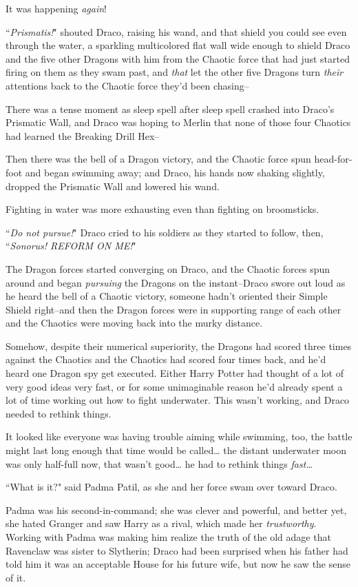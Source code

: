 It was happening \emph{again}!

``\emph{Prismatis!}" shouted Draco, raising his wand, and that shield you could see even through the water, a sparkling multicolored flat wall wide enough to shield Draco and the five other Dragons with him from the Chaotic force that had just started firing on them as they swam past, and \emph{that} let the other five Dragons turn \emph{their} attentions back to the Chaotic force they'd been chasing\---

There was a tense moment as sleep spell after sleep spell crashed into Draco's Prismatic Wall, and Draco was hoping to Merlin that none of those four Chaotics had learned the Breaking Drill Hex\---

Then there was the bell of a Dragon victory, and the Chaotic force spun head-for-foot and began swimming away; and Draco, his hands now shaking slightly, dropped the Prismatic Wall and lowered his wand.

Fighting in water was more exhausting even than fighting on broomsticks.

``\emph{Do not pursue!}" Draco cried to his soldiers as they started to follow, then, ``\emph{Sonorus! REFORM ON ME!}"

The Dragon forces started converging on Draco, and the Chaotic forces spun around and began \emph{pursuing} the Dragons on the instant\---Draco swore out loud as he heard the bell of a Chaotic victory, someone hadn't oriented their Simple Shield right\---and then the Dragon forces were in supporting range of each other and the Chaotics were moving back into the murky distance.

Somehow, despite their numerical superiority, the Dragons had scored three times against the Chaotics and the Chaotics had scored four times back, and he'd heard one Dragon spy get executed. Either Harry Potter had thought of a lot of very good ideas very fast, or for some unimaginable reason he'd already spent a lot of time working out how to fight underwater. This wasn't working, and Draco needed to rethink things.

It looked like everyone was having trouble aiming while swimming, too, the battle might last long enough that time would be called{\ldots} the distant underwater moon was only half-full now, that wasn't good{\ldots} he had to rethink things \emph{fast{\ldots}}

``What is it?" said Padma Patil, as she and her force swam over toward Draco.

Padma was his second-in-command; she was clever and powerful, and better yet, she hated Granger and saw Harry as a rival, which made her \emph{trustworthy}. Working with Padma was making him realize the truth of the old adage that Ravenclaw was sister to Slytherin; Draco had been surprised when his father had told him it was an acceptable House for his future wife, but now he saw the sense of it.

